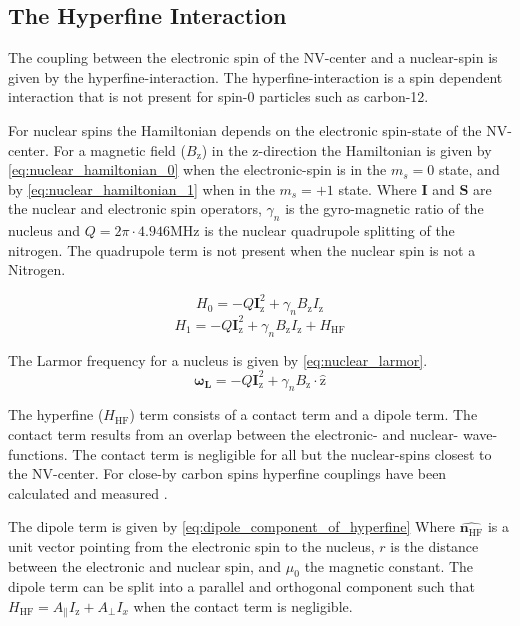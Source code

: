 \subsection{The Hyperfine Interaction}
The coupling between the electronic spin of the NV-center and a nuclear-spin is given by the hyperfine-interaction.
The hyperfine-interaction is a spin dependent interaction that is not present for spin-0 particles such as carbon-12.

For nuclear spins the Hamiltonian depends on the electronic spin-state of the NV-center.
For a magnetic field ($B_\mathrm{z}$) in the z-direction the Hamiltonian is given by \cref{eq:nuclear_hamiltonian_0} when the electronic-spin is in the $m_s = 0$ state, and by \cref{eq:nuclear_hamiltonian_1} when in the $m_s = +1$ state\citep{Taminiau2014Universal}.
Where $\bm{I}$ and $\bm{S}$ are the nuclear and electronic spin operators, $\gamma_n$ is the gyro-magnetic ratio of the nucleus and $Q= 2\pi \cdot 4.946 \mathrm{ MHz}$ \citep{Bernien2014Control} is the nuclear quadrupole splitting of the nitrogen.
The quadrupole term is not present when the nuclear spin is not a Nitrogen.

\begin{equation}
    \label{eq:nuclear_hamiltonian_0}
    H_0= -Q\bm{I}_{\mathrm{z}}^2+ \gamma_{n} B_\mathrm{z} I_\mathrm{z}
\end{equation}
\begin{equation}
    \label{eq:nuclear_hamiltonian_1}
    H_1 = -Q\bm{I}_{\mathrm{z}}^2+\gamma_{n} B_\mathrm{z} I_\mathrm{z} +H_{\mathrm{HF}}
\end{equation}

The Larmor frequency for a nucleus is given by  \cref{eq:nuclear_larmor}.
\begin{equation}
\label{eq:nuclear_larmor}
\bm{\omega_L} =-Q\bm{I}_{\mathrm{z}}^2+ \gamma_{n}B_\mathrm{z} \cdot\bm{\hat{\mathrm{z}}}
\end{equation}

The hyperfine ($H_{\mathrm{HF}}$) term consists of a contact term and a dipole term.
The contact term results from an overlap between the electronic- and nuclear- wave-functions.
The contact term is negligible for all but the nuclear-spins closest to the NV-center.
For close-by carbon spins hyperfine couplings have been  calculated \citep{Gali2008Ab,Gali2009Identification} and measured \citep{Smeltzer201113}.

The dipole term is given by \cref{eq:dipole_component_of_hyperfine} \citep{Lange2012Quantum}
Where $\hat{\bm{n_{\mathrm{HF}}}}$ is a unit vector pointing from the electronic spin to the nucleus, $r$ is the distance between the electronic and nuclear spin, and $\mu_0$ the magnetic constant.
The dipole term can be split into a parallel and orthogonal component such that $H_{\mathrm{HF}} = A_\parallel I_\mathrm{z} + A_\perp I_x $ when the contact term is negligible.


